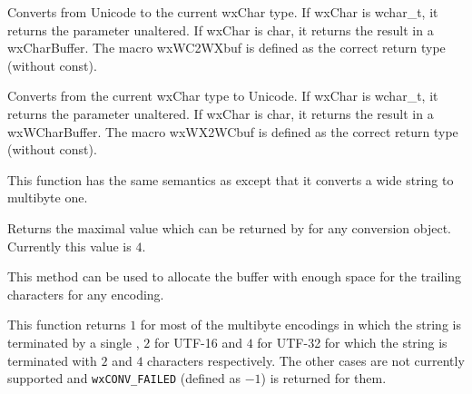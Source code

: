 
Converts from Unicode to the current wxChar type. If wxChar is wchar\_t,
it returns the parameter unaltered. If wxChar is char, it returns the
result in a wxCharBuffer. The macro wxWC2WXbuf is defined as the correct
return type (without const).


\label{wxmbconvcwx2wc}



Converts from the current wxChar type to Unicode. If wxChar is wchar\_t,
it returns the parameter unaltered. If wxChar is char, it returns the
result in a wxWCharBuffer. The macro wxWX2WCbuf is defined as the correct
return type (without const).


\label{wxmbconvfromwchar}


This function has the same semantics as  
except that it converts a wide string to multibyte one.

\label{wxmbconvgetmaxmbnullen}


Returns the maximal value which can be returned by 
 for any conversion object. Currently
this value is $4$.

This method can be used to allocate the buffer with enough space for the
trailing \NUL characters for any encoding.


\label{wxmbconvgetmbnullen}


This function returns $1$ for most of the multibyte encodings in which the
string is terminated by a single \NUL, $2$ for UTF-16 and $4$ for UTF-32 for
which the string is terminated with $2$ and $4$ \NUL characters respectively.
The other cases are not currently supported and \texttt{wxCONV\_FAILED} 
(defined as $-1$) is returned for them.


\label{wxmbconvtowchar}


